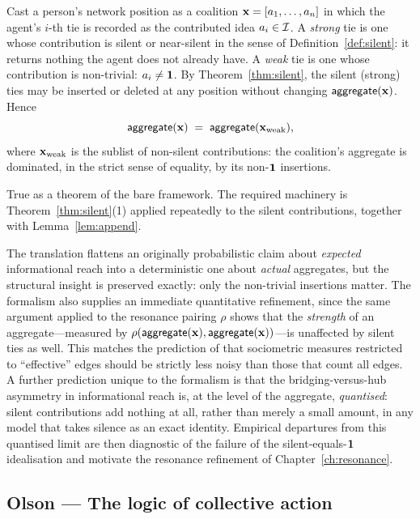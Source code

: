 \formalclaim
Cast a person's network position as a coalition $\mathbf{x} = [a_1, \ldots,
a_n]$ in which the agent's $i$-th tie is recorded as the contributed
idea $a_i \in \mathcal{I}$. A \emph{strong} tie is one whose
contribution is silent or near-silent in the sense of
Definition~\ref{def:silent}: it returns nothing the agent does not
already have. A \emph{weak} tie is one whose contribution is
non-trivial: $a_i \neq \mathbf{1}$. By
Theorem~\ref{thm:silent}, the silent (strong) ties may be inserted
or deleted at any position without changing $\mathsf{aggregate}(\mathbf{x})$.
Hence
\[
  \mathsf{aggregate}(\mathbf{x}) \;=\; \mathsf{aggregate}(\mathbf{x}_{\text{weak}}),
\]
where $\mathbf{x}_{\text{weak}}$ is the sublist of non-silent contributions:
the coalition's aggregate is dominated, in the strict sense of
equality, by its non-$\mathbf{1}$ insertions.

\formalstatus
True as a theorem of the bare framework. The required machinery is
Theorem~\ref{thm:silent}(1) applied repeatedly to the silent
contributions, together with Lemma~\ref{lem:append}.

\litcomment
The translation flattens an originally probabilistic claim about
\emph{expected} informational reach into a deterministic one about
\emph{actual} aggregates, but the structural insight is preserved
exactly: only the non-trivial insertions matter. The formalism also
supplies an immediate quantitative refinement, since the same
argument applied to the resonance pairing $\rho$ shows that the
\emph{strength} of an aggregate---measured by $\rho(\mathsf{aggregate}(\mathbf{x}),
\mathsf{aggregate}(\mathbf{x}))$---is unaffected by silent ties as well. This
matches the prediction of \cite{GranovetterStrength1983} that
sociometric measures restricted to ``effective'' edges should be
strictly less noisy than those that count all edges. A further
prediction unique to the formalism is that the bridging-versus-hub
asymmetry in informational reach is, at the level of the aggregate,
\emph{quantised}: silent contributions add nothing at all, rather than
merely a small amount, in any model that takes silence as an exact
identity. Empirical departures from this quantised limit are then
diagnostic of the failure of the silent-equals-$\mathbf{1}$ idealisation
and motivate the resonance refinement of Chapter~\ref{ch:resonance}.

\subsection*{Olson --- The logic of collective action}

\begin{zooentry*}\end{zooentry*}

